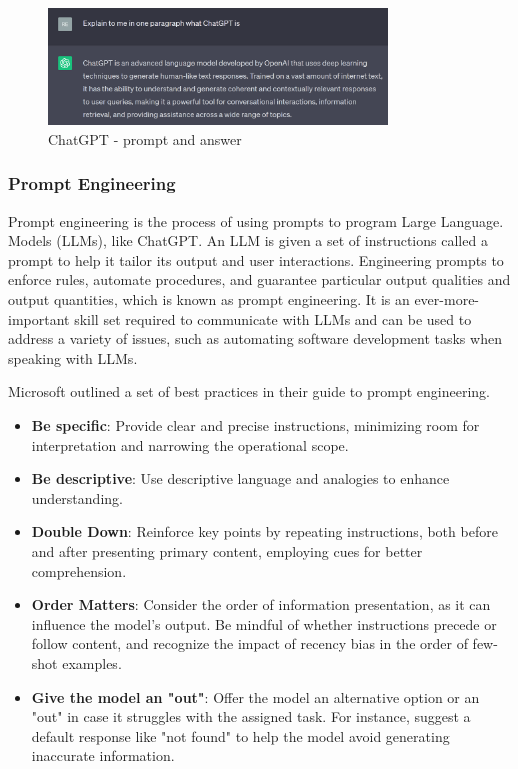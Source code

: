 \begin{figure}[ht!]
	\centering
	\includegraphics[width=90mm]{images/ChatGPT.png}
	\caption{ChatGPT - prompt and answer \label{ChatGPT}}
\end{figure}



\subsubsection{Prompt Engineering}
\label{prompt engineering}
Prompt engineering is the process of using prompts to program Large Language.
Models (LLMs), like ChatGPT. An LLM is given a set of instructions called a prompt
to help it tailor its output and user interactions. Engineering prompts to enforce
rules, automate procedures, and guarantee particular output qualities and output
quantities, which is known as prompt engineering. It is an ever-more-important skill set
required to communicate with LLMs and can be used to address a variety of issues,
such as automating software development tasks when speaking with LLMs. \cite{WhiteFHSOGESS}

Microsoft outlined a set of best practices in their guide to prompt engineering.

\begin{itemize}
	\item \textbf{Be specific}: Provide clear and precise instructions, minimizing room for interpretation and narrowing the operational scope.
	
	\item \textbf{Be descriptive}: Use descriptive language and analogies to enhance understanding.
	
	\item \textbf{Double Down}: Reinforce key points by repeating instructions, both before and after presenting primary content, employing cues for better comprehension.
	
	\item \textbf{Order Matters}:  Consider the order of information presentation, as it can influence the model's output. Be mindful of whether instructions precede or follow content, and recognize the impact of recency bias in the order of few-shot examples.
	
	\item \textbf{Give the model an "out"}: Offer the model an alternative option or an "out" in case it struggles with the assigned task. For instance, suggest a default response like "not found" to help the model avoid generating inaccurate information.\cite{MicrosoftLearn}
	
\end{itemize}

